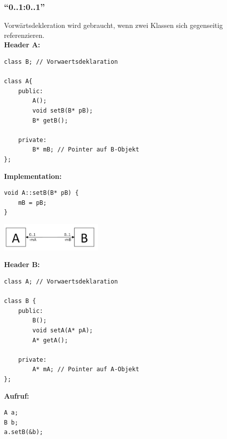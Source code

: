 \subsubsection{"`0..1:0..1"'}
\begin{multicols}{2}
Vorwärtsdekleration wird gebraucht, wenn zwei Klassen sich gegenseitig referenzieren. \\

\textbf{Header A:}
\begin{lstlisting}
class B; // Vorwaertsdeklaration

class A{
	public:
	    A();
		void setB(B* pB);
		B* getB();
		
	private:
		B* mB; // Pointer auf B-Objekt
};
\end{lstlisting}

\textbf{Implementation:}
\begin{lstlisting}
void A::setB(B* pB) {
	mB = pB;
}
\end{lstlisting}

\columnbreak
\includegraphics[width=5cm]{./bilder/Assozi_01_01.png}

\textbf{Header B:}
\begin{lstlisting}
class A; // Vorwaertsdeklaration

class B {	
	public:
		B();
		void setA(A* pA);
		A* getA();
		
	private: 
		A* mA; // Pointer auf A-Objekt
};
\end{lstlisting}

\textbf{Aufruf:}
\begin{lstlisting}
A a;
B b;
a.setB(&b);
\end{lstlisting}
\end{multicols}

